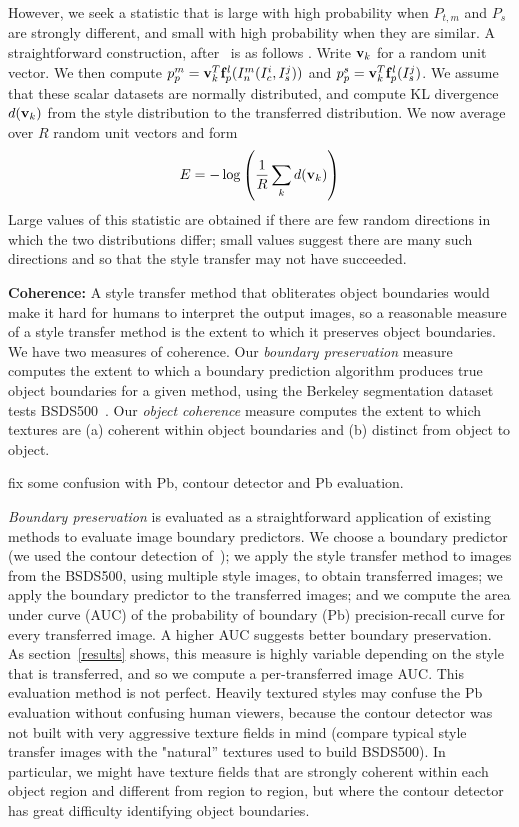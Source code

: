 \documentclass[runningheads]{llncs}
\newcommand{\vect}[1]{{\bf {#1}}}
\begin{document}
However, we seek a statistic that is large with high probability when $P_{t,m}$ and $P_s$ are strongly different, and 
small with high probability when they are similar.  A straightforward construction, after~\cite{DeshpandeCVPR2018} is as follows .
Write $\vect{v}_k$ for a random unit vector.  We then compute
$p_p^m=\vect{v}_k^T\vect{f}_p^{l}(I^m_n(I_c^i,I_s^j))$ and $p_p^s=\vect{v}_k^T\vect{f}_p^{l}(I_s^j)$.  We assume that
these scalar datasets are normally distributed, and compute KL divergence $d(\vect{v}_k)$ from the style distribution to the transferred
distribution.  We now average over $R$ random unit vectors and form
\[
E=-\log \left(\frac{1}{R} \sum_k d(\vect{v}_k)\right)
\]
Large values of this statistic are obtained if there are few random directions in which the two distributions differ;
small values suggest there are many such directions and so that the style transfer may not have succeeded.

{\bf Coherence:} A style transfer method that obliterates object boundaries would make it hard for humans to interpret
the output images, so a reasonable measure of a style transfer method is the extent to which it preserves object
boundaries.  We have two measures of coherence.  Our {\em boundary preservation} measure computes the extent to which a
boundary prediction algorithm produces true object boundaries for a given method, using the Berkeley segmentation dataset tests BSDS500~\cite{arbelaez2011contour}.  Our {\em object coherence} measure computes the extent to which textures are (a) coherent within object boundaries and (b) distinct from object to object.


\todo fix some confusion with Pb, contour detector and Pb evaluation. 

{\em Boundary preservation} is evaluated as a straightforward application of existing methods to evaluate image boundary 
predictors.  We choose a boundary predictor (we used the contour detection of~\cite{arbelaez2011contour}); we apply the style transfer method to images
from the BSDS500, using multiple style images,  to obtain transferred images; we apply the boundary predictor to the
transferred images; and we compute the area under curve (AUC) of the  probability of boundary (Pb) precision-recall curve for every transferred image.  A higher AUC suggests better boundary
preservation.  As section~\ref{results} shows, this measure is highly variable depending on the style that is
transferred, and so we compute a per-transferred image AUC. This evaluation method is not perfect.  Heavily textured styles may confuse the Pb evaluation without confusing human viewers, because the contour detector was not built with very aggressive texture fields in  mind (compare typical style transfer images with the  "natural'' textures used to build BSDS500).  In particular, we might have texture fields that are strongly coherent within each object region and different from region to region, but where the contour detector has great difficulty identifying object boundaries. 
\end{document}
